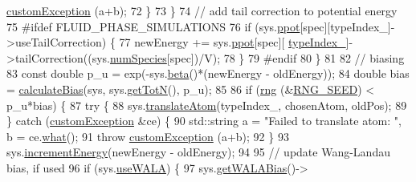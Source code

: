 \begin{DoxyCode}
      \hyperlink{classcustom_exception}{customException} (a+b);
72                                                 \}
73         \}
74         \textcolor{comment}{// add tail correction to potential energy}
75 \textcolor{preprocessor}{#ifdef FLUID\_PHASE\_SIMULATIONS}
76         \textcolor{keywordflow}{if} (sys.\hyperlink{classsim_system_a8d6271751a62f61edcf57f773540a4a3}{ppot}[spec][typeIndex\_]->useTailCorrection) \{
77                                                 newEnergy += sys.\hyperlink{classsim_system_a8d6271751a62f61edcf57f773540a4a3}{ppot}[spec][
      \hyperlink{classmc_move_acb731965547b0326ef318ec96da8b46a}{typeIndex\_}]->tailCorrection((sys.\hyperlink{classsim_system_a9eea865e6dc1cff377b1e79c4d9c23f0}{numSpecies}[spec])/V);
78                                 \}
79 \textcolor{preprocessor}{#endif}
80     \}
81     
82                 \textcolor{comment}{// biasing}
83                 \textcolor{keyword}{const} \textcolor{keywordtype}{double} p\_u = exp(-sys.\hyperlink{classsim_system_a3eeec9678902f8d7fce4dad6064aaf4c}{beta}()*(newEnergy - oldEnergy));
84                 \textcolor{keywordtype}{double} bias = \hyperlink{system_8cpp_ab912bbb9fc9045954cf1b3ccb286a55c}{calculateBias}(sys, sys.\hyperlink{classsim_system_a37dd827f4057049763351510147b9f1d}{getTotN}(), p\_u);
85                     
86                 \textcolor{keywordflow}{if} (\hyperlink{utilities_8cpp_a0f9542af4b475ac79cb679d7a8d14db0}{rng} (&\hyperlink{global_8h_a3f4e4ea24d5a5c66feae55d1f329c884}{RNG\_SEED}) < p\_u*bias) \{
87                     \textcolor{keywordflow}{try} \{
88             sys.\hyperlink{classsim_system_a22fdaceea44abd6cd021bac1ecd11890}{translateAtom}(typeIndex\_, chosenAtom, oldPos);
89         \} \textcolor{keywordflow}{catch} (\hyperlink{classcustom_exception}{customException} &ce) \{
90             std::string a = \textcolor{stringliteral}{"Failed to translate atom: "}, b = ce.\hyperlink{classcustom_exception_aeb6ab5848b038adfc68fde86a512f691}{what}();
91             \textcolor{keywordflow}{throw} \hyperlink{classcustom_exception}{customException} (a+b);
92         \}
93                                 sys.\hyperlink{classsim_system_a6ad31c08955b80873f865b3069618dcb}{incrementEnergy}(newEnergy - oldEnergy);      
94                                 
95                                 \textcolor{comment}{// update Wang-Landau bias, if used}
96                                 \textcolor{keywordflow}{if} (sys.\hyperlink{classsim_system_aa83b00006b3919fb6e13f1bdeadece6a}{useWALA}) \{
97                                                 sys.\hyperlink{classsim_system_a7cb5049de8b0988349e89e30e4000407}{getWALABias}()->

\end{DoxyCode}
